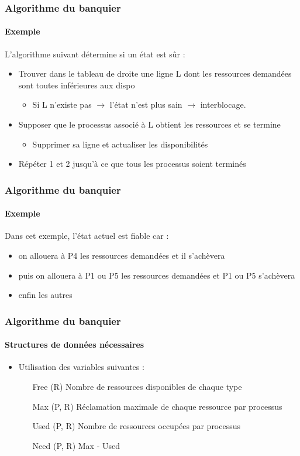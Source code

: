 \begin{frame}
\frametitle{Algorithme du banquier}
\framesubtitle{Exemple}
L'algorithme suivant détermine si un état est sûr :
\begin{itemize}
\item <1->Trouver dans le tableau de droite une ligne L dont les ressources demandées sont toutes inférieures aux dispo
\begin{itemize}
\item Si L n'existe pas $\rightarrow$ l'état n'est plus sain $\rightarrow$ interblocage.
\end{itemize}

\item <2->Supposer que le processus associé à L obtient les ressources et se termine
\begin{itemize}
\item Supprimer sa ligne et actualiser les disponibilités
\end{itemize}

\item <3->Répéter 1 et 2 jusqu'à ce que tous les processus soient terminés
\end{itemize}
\end{frame}

\begin{frame}
\frametitle{Algorithme du banquier}
\framesubtitle{Exemple}
Dans cet exemple, l'état actuel est fiable car :
\begin{itemize}
\item on allouera à P4 les ressources demandées et il s'achèvera
\item puis on allouera à P1 ou P5 les ressources demandées et P1 ou P5 s'achèvera
\item enfin les autres
\end{itemize}
\end{frame}

\begin{frame}
\frametitle{Algorithme du banquier}
\framesubtitle{Structures de données nécessaires}
\begin{itemize}
\item Utilisation des variables suivantes :
\begin{itemize}
\item [Free (R)] Nombre de ressources disponibles de chaque type
\item [Max (P, R)] Réclamation maximale de chaque ressource par processus
\item [Used (P, R)] Nombre de ressources occupées par processus
\item [Need (P, R)] Max - Used
\end{itemize}
\end{itemize}
\end{frame}

